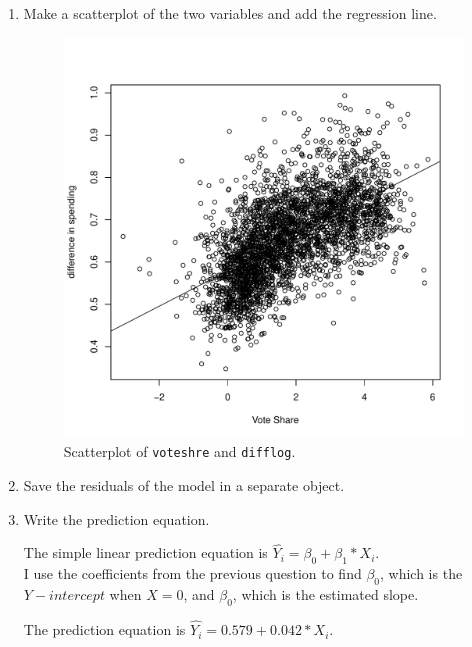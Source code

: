 \documentclass[12pt,letterpaper]{article}
\begin{document}
\begin{enumerate}
		\item Make a scatterplot of the two variables and add the regression line. 	
		\begin{figure}[h!]\centering
		\caption{\footnotesize Scatterplot of \texttt{voteshre} and \texttt{difflog}.
		}\vspace{-1cm}
		\label{fig:plot1}
		\includegraphics[width=.75\textwidth]{plot1.pdf}
	\end{figure}
	\vspace{.25cm}
		\item Save the residuals of the model in a separate object.	
		  
		\item Write the prediction equation.\vspace{.25cm}

		The simple linear prediction equation is $\hat{Y_{i}}={\beta_{0}}+{\beta_{1}}*X_i$.\\ I use the coefficients from the previous question to find ${\beta_{0}}$, which is the $Y-intercept$ when $X=0$, and ${\beta_{0}}$, which is the estimated slope.
		
		The prediction equation is $\hat{Y_{i}}=0.579+0.042*X_i$.\\
	\end{enumerate}
	
\newpage
\end{document}
